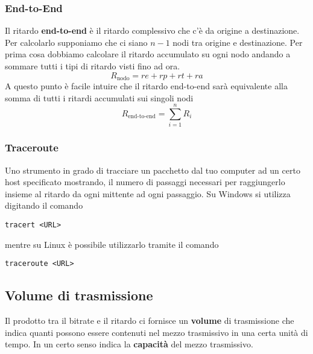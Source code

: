 \subsubsection{End-to-End}
Il ritardo \textbf{end-to-end} è il ritardo complessivo che c'è da 
origine a destinazione. Per calcolarlo supponiamo che ci siano $n-1$
nodi tra origine e destinazione. Per prima cosa dobbiamo calcolare il 
ritardo accumulato su ogni nodo andando a sommare tutti i tipi di 
ritardo visti fino ad ora.
\[ R_{\text{nodo}} = re + rp + rt + ra \]
A questo punto è facile intuire che il ritardo end-to-end sarà 
equivalente alla somma di tutti i ritardi accumulati sui singoli nodi
\[ R_\text{end-to-end} = \sum_{i=1}^n R_i \]

\subsubsection{Traceroute}
Uno strumento in grado di tracciare un pacchetto dal tuo computer ad un
certo host specificato mostrando, il numero di passaggi necessari per 
raggiungerlo insieme al ritardo da ogni mittente ad ogni passaggio. Su
Windows si utilizza digitando il comando
\begin{center}
	\verb|tracert <URL>|
\end{center}
mentre su Linux è possibile utilizzarlo tramite il comando 
\begin{center}
	\verb|traceroute <URL>|
\end{center}

\subsection{Volume di trasmissione}
Il prodotto tra il bitrate e il ritardo ci fornisce un \textbf{volume} 
di trasmissione che indica quanti possono essere contenuti nel mezzo 
trasmissivo in una certa unità di tempo. In un certo senso indica la 
\textbf{capacità} del mezzo trasmissivo.

